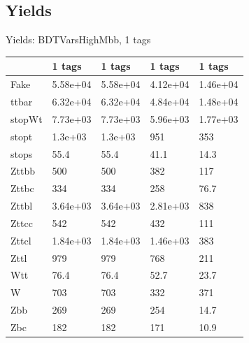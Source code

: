 
\subsection{Yields}

\begin{frame}{Yields: BDTVarsHighMbb, 1 tags}
\begin{center}
  \begin{tabular}{l| >{\centering\let\newline\\\arraybackslash\hspace{0pt}}m{1.4cm}| >{\centering\let\newline\\\arraybackslash\hspace{0pt}}m{1.4cm}| >{\centering\let\newline\\\arraybackslash\hspace{0pt}}m{1.4cm}| >{\centering\let\newline\\\arraybackslash\hspace{0pt}}m{1.4cm}}
    & 1 tags & 1 tags & 1 tags & 1 tags \\
 \hline \hline
    Fake& 5.58e+04 & 5.58e+04 & 4.12e+04 & 1.46e+04 \\
 \hline
    ttbar& 6.32e+04 & 6.32e+04 & 4.84e+04 & 1.48e+04 \\
 \hline
    stopWt& 7.73e+03 & 7.73e+03 & 5.96e+03 & 1.77e+03 \\
 \hline
    stopt& 1.3e+03 & 1.3e+03 & 951 & 353 \\
 \hline
    stops& 55.4 & 55.4 & 41.1 & 14.3 \\
 \hline
    Zttbb& 500 & 500 & 382 & 117 \\
 \hline
    Zttbc& 334 & 334 & 258 & 76.7 \\
 \hline
    Zttbl& 3.64e+03 & 3.64e+03 & 2.81e+03 & 838 \\
 \hline
    Zttcc& 542 & 542 & 432 & 111 \\
 \hline
    Zttcl& 1.84e+03 & 1.84e+03 & 1.46e+03 & 383 \\
 \hline
    Zttl& 979 & 979 & 768 & 211 \\
 \hline
    Wtt& 76.4 & 76.4 & 52.7 & 23.7 \\
 \hline
    W& 703 & 703 & 332 & 371 \\
 \hline
    Zbb& 269 & 269 & 254 & 14.7 \\
 \hline
    Zbc& 182 & 182 & 171 & 10.9 \\

\end{tabular}
\end{center}
\end{frame}
